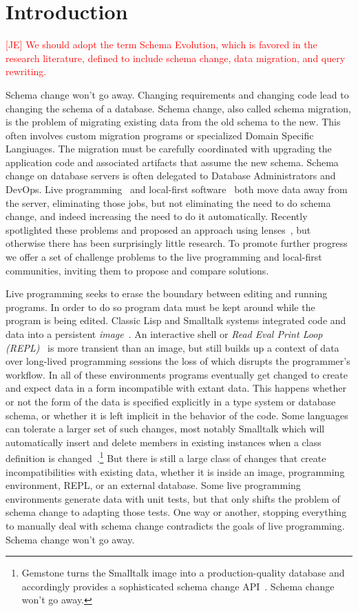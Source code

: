 \documentclass[english,submission]{programming}
\begin{document}
\section{Introduction}

\textcolor{red}{[JE] We should adopt the term Schema Evolution, which is favored in the research literature, defined to include schema change, data migration, and query rewriting. }

Schema change won't go away. Changing requirements and changing code lead to changing the schema of a database. Schema change, also called schema migration, is the problem of migrating existing data from the old schema to the new. This often involves custom migration programs or specialized Domain Specific Langiuages. The migration must be carefully coordinated with upgrading the application code and associated artifacts that assume the new schema. Schema change on database servers is often delegated to Database Administrators and DevOps. Live programming~\cite{tanimoto90,Hancock03} and local-first software~\cite{localfirst} both move data away from the server, eliminating those jobs, but not eliminating the need to do schema change, and indeed increasing the need to do it automatically. Recently \citet{Cambria} spotlighted these problems and proposed an approach using lenses~\cite{Foster2007}, but otherwise there has been surprisingly little research. To promote further progress we offer a set of challenge problems to the live programming and local-first communities, inviting them to propose and compare solutions.

Live programming seeks to erase the boundary between editing and running programs. In order to do so program data must be kept around while the program is being edited. Classic Lisp and Smalltalk systems integrated code and data into a persistent \textit{image}~\cite{Sandewall78, Goldberg80}. An interactive shell or \textit{Read Eval Print Loop (REPL)}~\cite{Deutsch64} is more transient than an image, but still builds up a context of data over long-lived programming sessions the loss of which disrupts the programmer's workflow. In all of these environments programs eventually get changed to create and expect data in a form incompatible with extant data. This happens whether or not the form of the data is specified explicitly in a type system or database schema, or whether it is left implicit in the behavior of the code. Some languages can tolerate a larger set of such changes, most notably Smalltalk which will automatically insert and delete members in existing instances when a class definition is changed~\cite[pp.252-272]{Goldberg80}.\footnote{Gemstone turns the Smalltalk image into a production-quality database and accordingly provides a sophisticated schema change API~\cite{Gemstone}. Schema change won't go away.} But there is still a large class of changes that create incompatibilities with existing data, whether it is inside an image, programming environment, REPL, or an external database. Some live programming environments generate data with unit tests, but that only shifts the problem of schema change to adapting those tests. One way or another, stopping everything to manually deal with schema change contradicts the goals of live programming. Schema change won't go away.
\end{document}
